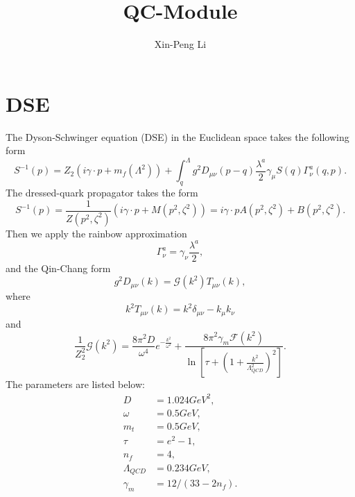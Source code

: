 \documentclass{article}
\title{QC-Module}
\author{Xin-Peng Li}
\begin{document}
\maketitle
\tableofcontents
\thispagestyle{empty}
\setcounter{page}{0}
\newpage
\section{DSE}
The Dyson-Schwinger equation (DSE) in the Euclidean space takes the following form
\begin{equation}
    S^{-1}\left(p\right)=Z_2\left(i\gamma\cdot p+m_{f}\left(\Lambda^2\right)\right)+\int_{q}^{\Lambda}g^2D_{\mu\nu}\left(p-q\right)\frac{\lambda^a}{2}\gamma_{\mu}S\left(q\right)\Gamma_{\nu}^{a}\left(q,p\right).
\end{equation}
The dressed-quark propagator takes the form
\begin{equation}
    S^{-1}\left(p\right)=\frac{1}{Z\left(p^2,\zeta^2\right)}\left({i\gamma\cdot p+M\left(p^2,\zeta^2\right)}\right)=i\gamma\cdot pA\left(p^2,\zeta^2\right)+B\left(p^2,\zeta^2\right).
\end{equation}
Then we apply the rainbow approximation
\begin{equation}
    \Gamma_{\nu}^{a}=\gamma_{\nu}\frac{\lambda^a}{2},
\end{equation}
and the Qin-Chang form
\begin{equation}
    g^2D_{\mu\nu}\left(k\right)=\mathcal{G}\left(k^2\right)T_{\mu\nu}\left(k\right),
    \end{equation}
where
\begin{equation}
    k^2T_{\mu\nu}\left(k\right)=k^2\delta_{\mu\nu}-k_{\mu}k_{\nu}
\end{equation}
and
\begin{equation}
    \frac{1}{Z_{2}^2}\mathcal{G}\left(k^2\right)=\frac{8\pi^2D}{\omega^4}e^{-\frac{k^2}{\omega^2}}+\frac{8\pi^2\gamma_m\mathcal{F}\left(k^2\right)}{\ln[\tau+\left(1+\frac{k^2}{\Lambda_{QCD}^2}\right)^2]}.
\end{equation}
The parameters are listed below:
\begin{equation}
    \begin{split}
        D&=1.024 GeV^2,\\
        \omega&=0.5 GeV,\\
        m_t&=0.5 GeV,\\
        \tau&=e^2-1,\\
        n_f&=4,\\
        \Lambda_{QCD}&=0.234 GeV,\\
        \gamma_m&=12/(33-2n_f).
    \end{split}
\end{equation}
\end{document}
